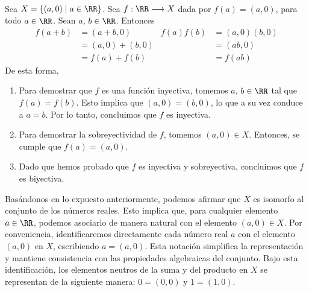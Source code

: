 \begin{adjustwidth}{-7.6cm}{-2cm}
    \begin{tcolorbox}[
        theorem style=change break,
        enhanced,
        breakable,
        boxrule=0pt,
        frame hidden,
        left = 1.8cm,
        right = 1.8cm,
        top=4mm,
        bottom=2mm,
        colback=black!7!white,
        coltitle=black,
        attach title to upper={\ },
        sharp corners,
        borderline north={1.5pt}{0pt}{black},
        title = {Isomorfismo entre los números reales:},
        fonttitle=\selectfont\Lato\bfseries\LARGE,
        fontupper=\normalsize
    ]
        \,\\[4mm]
        Sea $X = \{(a, 0) \mid a \in \RR \}$. Sea $f: \RR \longrightarrow X$ dada por $f(a) = (a, 0)$, para todo $a \in \RR$. Sean $a$, $b \in \RR$. Entonces
        \begin{align*}
            f(a + b) & = (a + b, 0) & f(a) f(b) & = (a, 0)(b, 0) \\
            & = (a, 0) + (b, 0) & & = (a b, 0) \\
            & = f(a) + f(b) & & = f(a b)
        \end{align*}
        De esta forma,\vspace{0.3cm}
        \begin{enumerate}[label=\roman*., topsep=6pt, itemsep=0pt]
            \item Para demostrar que $f$ es una función inyectiva, tomemos $a$, $b \in \RR$ tal que $f(a) = f(b)$. Esto implica que $(a, 0) = (b, 0)$, lo que a su vez conduce a $a = b$. Por lo tanto, concluimos que $f$ es inyectiva.
            \item Para demostrar la sobreyectividad de $f$, tomemos $(a, 0) \in X$. Entonces, se cumple que $f(a)=(a, 0)$.
            \item Dado que hemos probado que $f$ es inyectiva y sobreyectiva, concluimos que $f$ es biyectiva.\\
        \end{enumerate}
        Basándonos en lo expuesto anteriormente, podemos afirmar que $X$ es isomorfo al conjunto de los números reales. Esto implica que, para cualquier elemento $a \in \RR$, podemos asociarlo de manera natural con el elemento $(a, 0) \in X$. Por conveniencia, identificaremos directamente cada número real $a$ con el elemento $(a, 0)$ en $X$, escribiendo $a = (a, 0)$. Esta notación simplifica la representación y mantiene consistencia con las propiedades algebraicas del conjunto. Bajo esta identificación, los elementos neutros de la suma y del producto en $X$ se representan de la siguiente manera: $0 = (0, 0)$ y $1 = (1, 0)$.
    \end{tcolorbox}
\end{adjustwidth}

